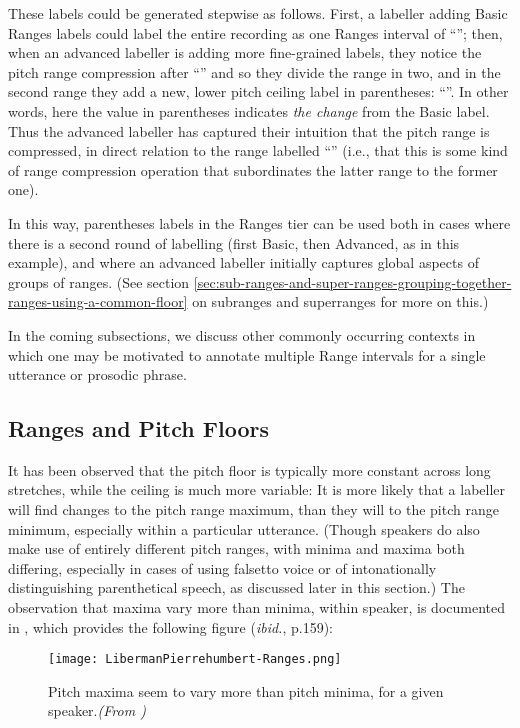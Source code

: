 These labels could be generated stepwise as follows. First, a labeller adding Basic Ranges labels could label the entire recording as one Ranges interval of “”; then, when an advanced labeller is adding more fine-grained labels, they notice the pitch range compression after “” and so they divide the range in two, and in the second range they add a new, lower pitch ceiling label in parentheses: “”. In other words, here the value in parentheses indicates \emph{the change} from the Basic label. Thus the advanced labeller has captured their intuition that the pitch range is compressed, in direct relation to the range labelled “” (i.e., that this is some kind of range compression operation that subordinates the latter range to the former one).

In this way, parentheses labels in the Ranges tier can be used both in cases where there is a second round of labelling (first Basic, then Advanced, as in this example), and where an advanced labeller initially captures global aspects of groups of ranges. (See section \ref{sec:sub-ranges-and-super-ranges-grouping-together-ranges-using-a-common-floor} on subranges and superranges for more on this.)

In the coming subsections, we discuss other commonly occurring contexts in which one may be motivated to annotate multiple Range intervals for a single utterance or prosodic phrase.

\subsection{Ranges and Pitch Floors}\label{sec:ranges-and-pitch-floors}

It has been observed that the pitch floor is typically more constant across long stretches, while the ceiling is much more variable: It is more likely that a labeller will find changes to the pitch range maximum, than they will to the pitch range minimum, especially within a particular utterance. (Though speakers do also make use of entirely different pitch ranges, with minima and maxima both differing, especially in cases of using falsetto voice or of intonationally distinguishing parenthetical speech, as discussed later in this section.) The observation that maxima vary more than minima, within speaker, is documented in \citealt{libermanpierrehumbert84}, which provides the following figure (\textit{ibid.}, p.159):

\begin{figure}[H]
\centering
%
\texttt{[image: LibermanPierrehumbert-Ranges.png]}
%
\caption{Pitch maxima seem to vary more than pitch minima, for a given speaker.\textit{(From \citealt{libermanpierrehumbert84})}%
\label{fig:Liberman Pierrehumbert Ranges}%
}
\end{figure}

